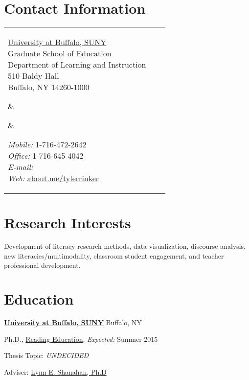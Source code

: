 


\section{Contact Information}


\newlength{\rcollength}\setlength{\rcollength}{2.1in}%
\newlength{\spacewidth}\setlength{\spacewidth}{20pt}
\begin{tabular}[t]{@{}p{\textwidth-\rcollength-\spacewidth}@{}p{\spacewidth}@{}p{\rcollength}}%

\parbox{\textwidth-\rcollength-\spacewidth}{%
\href{http://www.buffalo.edu/}{University at Buffalo, SUNY}\\
Graduate School of Education\\
Department of Learning and Instruction\\	
510 Baldy Hall\\
Buffalo, NY 14260-1000\\}

&
\parbox[m][5\baselineskip]{\spacewidth}{} &

\parbox{\rcollength}{%
\textit{Mobile:} 1-716-472-2642 \\
\textit{Office:} 1-716-645-4042 \\
\textit{E-mail:} \\
\textit{Web:} \href{http://about.me/tylerrinker}{about.me/tylerrinker}}

\end{tabular}

\section{Research Interests}

Development of literacy research methods, data visualization, discourse analysis, new literacies/multimodality, classroom student engagement, and teacher professional development.

\section{Education}

\href{http://www.buffalo.edu/}{\textbf{University at Buffalo, SUNY}}
Buffalo, NY
\begin{outerlist}

\item[] Ph.D.,
        \href{http://gse.buffalo.edu/lai/doc}
             {Reading Education},
             \emph{Expected:} Summer 2015
        \begin{innerlist}
        \item Thesis Topic: \emph{UNDECIDED}
        \item Adviser:
              \href{http://gse.buffalo.edu/about/directory/faculty/2110}
                   {Lynn E. Shanahan, Ph.D} 
        \end{innerlist}
\end{outerlist}
\vspace{.1in}

